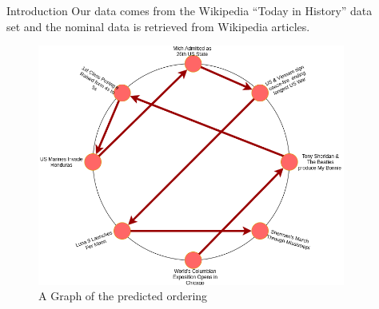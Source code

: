 \documentclass[final]{beamer}
\newlength{\sepwid}
\newlength{\onecolwid}
\newlength{\twocolwid}
\begin{document}
\begin{frame}[t]
\begin{columns}[t]
\begin{column}{\onecolwid}
\begin{block}{Introduction}
Our data comes from the Wikipedia ``Today in History'' data set and the nominal data is retrieved
from Wikipedia articles.
\vspace{6cm}
\begin{figure}
\includegraphics[]{node-graph.png}
\caption{A Graph of the predicted ordering}
\label{node_graph}
\end{figure}

\end{block}




\end{column} %

\begin{column}{\sepwid}\end{column} %

\begin{column}{\twocolwid} %

\begin{columns}[t,totalwidth=\twocolwid] %

\begin{column}{\onecolwid}\vspace{-.6in} %



\end{column}
\end{columns}
\end{column}
\end{columns}
\end{frame}
\end{document}
